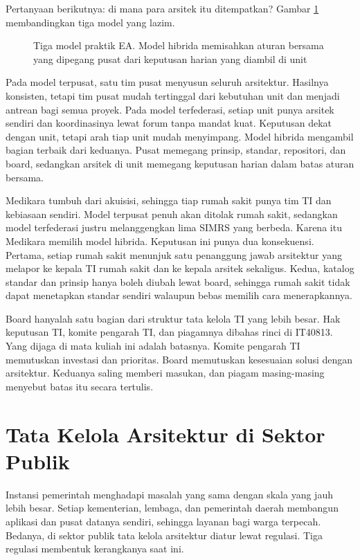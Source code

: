 Pertanyaan berikutnya: di mana para arsitek itu ditempatkan? Gambar
\ref{fig:ch14-model-praktik} membandingkan tiga model yang lazim.

\begin{figure}[!htb]
  \centering
  
  \caption{Tiga model praktik EA. Model hibrida memisahkan aturan bersama
           yang dipegang pusat dari keputusan harian yang diambil di unit}
  \label{fig:ch14-model-praktik}
\end{figure}

Pada model terpusat, satu tim pusat menyusun seluruh arsitektur. Hasilnya
konsisten, tetapi tim pusat mudah tertinggal dari kebutuhan unit dan
menjadi antrean bagi semua proyek. Pada model terfederasi, setiap unit
punya arsitek sendiri dan koordinasinya lewat forum tanpa mandat kuat.
Keputusan dekat dengan unit, tetapi arah tiap unit mudah menyimpang. Model
hibrida mengambil bagian terbaik dari keduanya. Pusat memegang prinsip,
standar, repositori, dan board, sedangkan arsitek di unit memegang
keputusan harian dalam batas aturan bersama.

Medikara tumbuh dari akuisisi, sehingga tiap rumah sakit punya tim TI dan
kebiasaan sendiri. Model terpusat penuh akan ditolak rumah sakit, sedangkan
model terfederasi justru melanggengkan lima SIMRS yang berbeda. Karena itu
Medikara memilih model hibrida. Keputusan ini punya dua konsekuensi.
Pertama, setiap rumah sakit menunjuk satu penanggung jawab arsitektur yang
melapor ke kepala TI rumah sakit dan ke kepala arsitek sekaligus. Kedua,
katalog standar dan prinsip hanya boleh diubah lewat board, sehingga rumah
sakit tidak dapat menetapkan standar sendiri walaupun bebas memilih cara
menerapkannya.

Board hanyalah satu bagian dari struktur tata kelola TI yang lebih besar.
Hak keputusan TI, komite pengarah TI, dan piagamnya dibahas rinci di
IT40813. Yang dijaga di mata kuliah ini adalah batasnya. Komite pengarah TI
memutuskan investasi dan prioritas. Board memutuskan kesesuaian solusi
dengan arsitektur. Keduanya saling memberi masukan, dan piagam masing-masing
menyebut batas itu secara tertulis.

\section{Tata Kelola Arsitektur di Sektor Publik}

Instansi pemerintah menghadapi masalah yang sama dengan skala yang jauh
lebih besar. Setiap kementerian, lembaga, dan pemerintah daerah membangun
aplikasi dan pusat datanya sendiri, sehingga layanan bagi warga terpecah.
Bedanya, di sektor publik tata kelola arsitektur diatur lewat regulasi.
Tiga regulasi membentuk kerangkanya saat ini.

